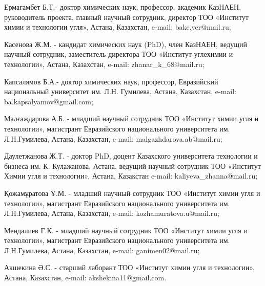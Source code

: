 \begin{info}
Ермагамбет Б.Т.- доктор химических наук, профессор, академик КазНАЕН,
руководитель проекта, главный научный сотрудник, директор ТОО «Институт
химии и технологии угля», Астана, Казахстан, e-mail:
bake.yer@mail.ru; 

Касенова Ж.М. - кандидат химических наук (PhD), член КазНАЕН, ведущий
научный сотрудник, заместитель директора ТОО «Институт углехимии и
технологии», Астана, Казахстан, e-mail: zhanar\_k\_68@mail.ru;

Капсалямов Б.А.- доктор химических наук, профессор, Евразийский
национальный университет им. Л.Н. Гумилева, Астана, Казахстан, e-mail:
ba.kapsalyamov@gmail.com;

Малғаждарова А.Б. - младший научный сотрудник ТОО «Институт химии угля и
технологии», магистрант Евразийского национального университета им.
Л.Н.Гумилева, Астана, Казахстан, e-mail: malgazhdarova.ab@mail.ru;

Даулетжанова Ж.Т. - доктор PhD, доцент Казахского университета
технологии и бизнеса им. К. Кулажанова, Астана, ведущий научный
сотрудник ТОО «Институт Химии угля и технологии», Астана, Казакстан
e-mail: kaliyeva\_zhanna@mail.ru;

Қожамұратова Ұ.М. - младший научный сотрудник ТОО «Институт химии угля и
технологии», магистрант Евразийского национального университета им.
Л.Н.Гумилева, Астана, Казахстан, e-mail: kozhamuratova.u@mail.ru;

Мендалиев Г.К. - младший научный сотрудник ТОО «Институт химии угля и
технологии», магистрант Евразийского национального университета им.
Л.Н.Гумилева, Астана, Казахстан, e-mail: ganimen02@mail.ru;

Акшекина Ә.С. - старший лаборант ТОО «Институт химии угля и технологии»,
Астана, Казахстан, e-mail: akshekina11@gmail.com.
\end{info}
